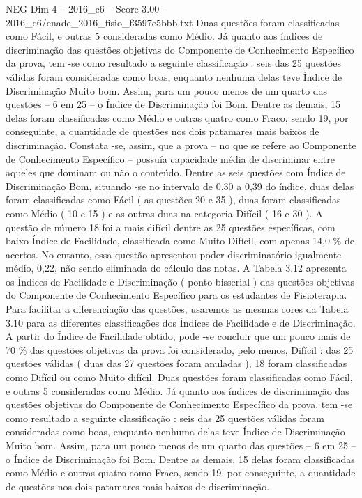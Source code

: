\begin{textsample}{NEG Dim 4 – 2016\_c6 – Score 3.00 – 2016\_c6/enade\_2016\_fisio\_f3597e5bbb.txt}
Duas questões foram classificadas como Fácil, e outras 5 consideradas como Médio.
Já quanto aos índices de discriminação das questões objetivas do Componente de Conhecimento Específico da prova, tem -se como resultado a seguinte classificação : seis das 25 questões válidas foram consideradas como boas, enquanto nenhuma delas teve Índice de Discriminação Muito bom.
Assim, para um pouco menos de um quarto das questões – 6 em 25 – o Índice de Discriminação foi Bom.
Dentre as demais, 15 delas foram classificadas como Médio e outras quatro como Fraco, sendo 19, por conseguinte, a quantidade de questões nos dois patamares mais baixos de discriminação.
Constata -se, assim, que a prova – no que se refere ao Componente de Conhecimento Específico – possuía capacidade média de discriminar entre aqueles que dominam ou não o conteúdo.
Dentre as seis questões com Índice de Discriminação Bom, situando -se no intervalo de 0,30 a 0,39 do índice, duas delas foram classificadas como Fácil ( as questões 20 e 35 ), duas foram classificadas como Médio ( 10 e 15 ) e as outras duas na categoria Difícil ( 16 e 30 ).
A questão de número 18 foi a mais difícil dentre as 25 questões específicas, com baixo Índice de Facilidade, classificada como Muito Difícil, com apenas 14,0 \% de acertos.
No entanto, essa questão apresentou poder discriminatório igualmente médio, 0,22, não sendo eliminada do cálculo das notas.
A Tabela 3.12 apresenta os Índices de Facilidade e Discriminação ( ponto-bisserial ) das questões objetivas do Componente de Conhecimento Específico para os estudantes de Fisioterapia.
Para facilitar a diferenciação das questões, usaremos as mesmas cores da Tabela 3.10 para as diferentes classificações dos Índices de Facilidade e de Discriminação.
A partir do Índice de Facilidade obtido, pode -se concluir que um pouco mais de 70 \% das questões objetivas da prova foi considerado, pelo menos, Difícil : das 25 questões válidas ( duas das 27 questões foram anuladas ), 18 foram classificadas como Difícil ou como Muito difícil.
Duas questões foram classificadas como Fácil, e outras 5 consideradas como Médio.
Já quanto aos índices de discriminação das questões objetivas do Componente de Conhecimento Específico da prova, tem -se como resultado a seguinte classificação : seis das 25 questões válidas foram consideradas como boas, enquanto nenhuma delas teve Índice de Discriminação Muito bom.
Assim, para um pouco menos de um quarto das questões – 6 em 25 – o Índice de Discriminação foi Bom.
Dentre as demais, 15 delas foram classificadas como Médio e outras quatro como Fraco, sendo 19, por conseguinte, a quantidade de questões nos dois patamares mais baixos de discriminação.

\end{textsample}

